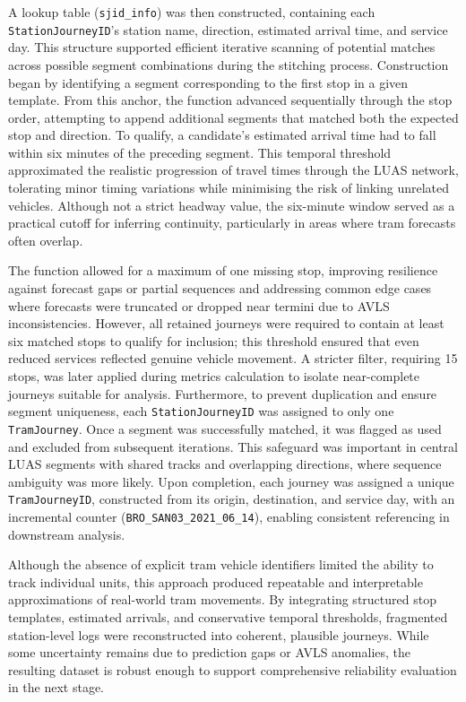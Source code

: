     A lookup table (\texttt{sjid\_info}) was then constructed, containing each \texttt{Station\allowbreak Journey\allowbreak ID}’s station name, direction, estimated arrival time, and service day. This structure supported efficient iterative scanning of potential matches across possible segment combinations during the stitching process. Construction began by identifying a segment corresponding to the first stop in a given template. From this anchor, the function advanced sequentially through the stop order, attempting to append additional segments that matched both the expected stop and direction. To qualify, a candidate’s estimated arrival time had to fall within six minutes of the preceding segment. This temporal threshold approximated the realistic progression of travel times through the LUAS network, tolerating minor timing variations while minimising the risk of linking unrelated vehicles. Although not a strict headway value, the six-minute window served as a practical cutoff for inferring continuity, particularly in areas where tram forecasts often overlap.

    The function allowed for a maximum of one missing stop, improving resilience against forecast gaps or partial sequences and addressing common edge cases where forecasts were truncated or dropped near termini due to AVLS inconsistencies. However, all retained journeys were required to contain at least six matched stops to qualify for inclusion; this threshold ensured that even reduced services reflected genuine vehicle movement. A stricter filter, requiring 15 stops, was later applied during metrics calculation to isolate near-complete journeys suitable for analysis. Furthermore, to prevent duplication and ensure segment uniqueness, each \texttt{StationJourneyID} was assigned to only one \texttt{TramJourney}. Once a segment was successfully matched, it was flagged as used and excluded from subsequent iterations. This safeguard was important in central LUAS segments with shared tracks and overlapping directions, where sequence ambiguity was more likely. Upon completion, each journey was assigned a unique \texttt{TramJourneyID}, constructed from its origin, destination, and service day, with an incremental counter (\texttt{BRO\_SAN03\_2021\_06\_14}), enabling consistent referencing in downstream analysis.

    Although the absence of explicit tram vehicle identifiers limited the ability to track individual units, this approach produced repeatable and interpretable approximations of real-world tram movements. By integrating structured stop templates, estimated arrivals, and conservative temporal thresholds, fragmented station-level logs were reconstructed into coherent, plausible journeys. While some uncertainty remains due to prediction gaps or AVLS anomalies, the resulting dataset is robust enough to support comprehensive reliability evaluation in the next stage.

